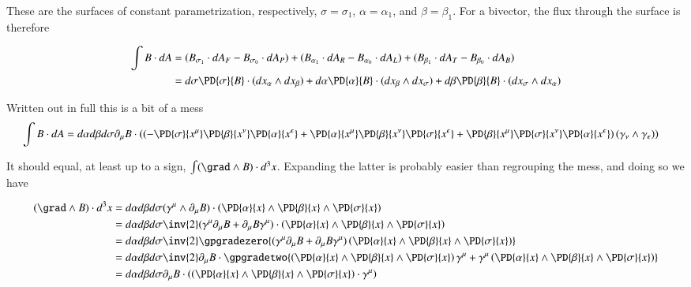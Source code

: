 These are the surfaces of constant parametrization, respectively, $\sigma = \sigma_1$, $\alpha = \alpha_1$, and $\beta = \beta_1$.  For a bivector, the flux through the surface is therefore

\begin{align*}
\int B \cdot dA &= (B_{\sigma_1} \cdot dA_F - B_{\sigma_0} \cdot dA_P ) + (B_{\alpha_1} \cdot dA_R - B_{\alpha_0} \cdot dA_L) + (B_{\beta_1} \cdot dA_T - B_{\beta_0} \cdot dA_B) \\ &= d \sigma \PD{\sigma}{B} \cdot (dx_\alpha \wedge dx_\beta ) + d \alpha \PD{\alpha}{B} \cdot (dx_\beta \wedge dx_\sigma) + d \beta \PD{\beta}{B} \cdot (dx_\sigma \wedge dx_\alpha ) \\
\end{align*}

Written out in full this is a bit of a mess
\begin{align}\label{eqn:mess}
\int B \cdot dA &= d \alpha d\beta d\sigma \partial_\mu B \cdot \left( \left( - \PD{\sigma}{x^\mu} \PD{\beta}{x^\nu} \PD{\alpha}{x^\epsilon} + \PD{\alpha}{x^\mu} \PD{\beta}{x^\nu} \PD{\sigma}{x^\epsilon} + \PD{\beta}{x^\mu} \PD{\sigma}{x^\nu} \PD{\alpha}{x^\epsilon} \right) (\gamma_\nu \wedge \gamma_\epsilon ) \right) 
\end{align}

It should equal, at least up to a sign, $\int (\grad \wedge B) \cdot d^3 x$.  Expanding the latter is probably easier than regrouping the mess, and doing so we have

\begin{align*}
(\grad \wedge B) \cdot d^3 x &= d\alpha d\beta d\sigma ( \gamma^\mu \wedge \partial_\mu B)  \cdot \left( \PD{\alpha}{x} \wedge \PD{\beta}{x} \wedge \PD{\sigma}{x} \right) \\ &= d\alpha d\beta d\sigma \inv{2} ( \gamma^\mu \partial_\mu B + \partial_\mu B \gamma^\mu )  \cdot \left( \PD{\alpha}{x} \wedge \PD{\beta}{x} \wedge \PD{\sigma}{x} \right) \\ &= d\alpha d\beta d\sigma \inv{2} \gpgradezero{ ( \gamma^\mu \partial_\mu B + \partial_\mu B \gamma^\mu )  \left( \PD{\alpha}{x} \wedge \PD{\beta}{x} \wedge \PD{\sigma}{x} \right) } \\ &= d\alpha d\beta d\sigma \inv{2} \partial_\mu B \cdot \gpgradetwo{ \left( \PD{\alpha}{x} \wedge \PD{\beta}{x} \wedge \PD{\sigma}{x} \right) \gamma^\mu + \gamma^\mu \left( \PD{\alpha}{x} \wedge \PD{\beta}{x} \wedge \PD{\sigma}{x} \right) } \\ &= d\alpha d\beta d\sigma \partial_\mu B \cdot \left( \left( \PD{\alpha}{x} \wedge \PD{\beta}{x} \wedge \PD{\sigma}{x} \right) \cdot \gamma^\mu \right) \\
\end{align*}

